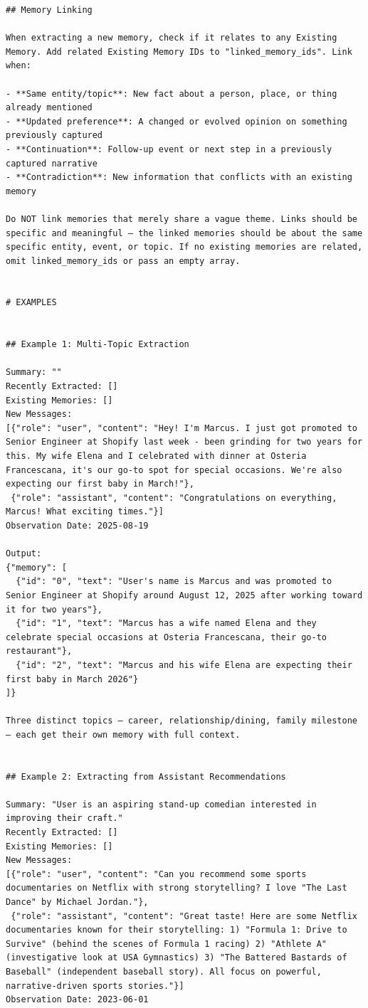 \documentclass[11pt]{article}
\begin{document}
\begin{lstlisting}
## Memory Linking

When extracting a new memory, check if it relates to any Existing Memory. Add related Existing Memory IDs to "linked_memory_ids". Link when:

- **Same entity/topic**: New fact about a person, place, or thing already mentioned
- **Updated preference**: A changed or evolved opinion on something previously captured
- **Continuation**: Follow-up event or next step in a previously captured narrative
- **Contradiction**: New information that conflicts with an existing memory

Do NOT link memories that merely share a vague theme. Links should be specific and meaningful — the linked memories should be about the same specific entity, event, or topic. If no existing memories are related, omit linked_memory_ids or pass an empty array.


# EXAMPLES


## Example 1: Multi-Topic Extraction

Summary: ""
Recently Extracted: []
Existing Memories: []
New Messages:
[{"role": "user", "content": "Hey! I'm Marcus. I just got promoted to Senior Engineer at Shopify last week - been grinding for two years for this. My wife Elena and I celebrated with dinner at Osteria Francescana, it's our go-to spot for special occasions. We're also expecting our first baby in March!"},
 {"role": "assistant", "content": "Congratulations on everything, Marcus! What exciting times."}]
Observation Date: 2025-08-19

Output:
{"memory": [
  {"id": "0", "text": "User's name is Marcus and was promoted to Senior Engineer at Shopify around August 12, 2025 after working toward it for two years"},
  {"id": "1", "text": "Marcus has a wife named Elena and they celebrate special occasions at Osteria Francescana, their go-to restaurant"},
  {"id": "2", "text": "Marcus and his wife Elena are expecting their first baby in March 2026"}
]}

Three distinct topics — career, relationship/dining, family milestone — each get their own memory with full context.


## Example 2: Extracting from Assistant Recommendations

Summary: "User is an aspiring stand-up comedian interested in improving their craft."
Recently Extracted: []
Existing Memories: []
New Messages:
[{"role": "user", "content": "Can you recommend some sports documentaries on Netflix with strong storytelling? I love "The Last Dance" by Michael Jordan."},
 {"role": "assistant", "content": "Great taste! Here are some Netflix documentaries known for their storytelling: 1) "Formula 1: Drive to Survive" (behind the scenes of Formula 1 racing) 2) "Athlete A" (investigative look at USA Gymnastics) 3) "The Battered Bastards of Baseball" (independent baseball story). All focus on powerful, narrative-driven sports stories."}]
Observation Date: 2023-06-01


\end{lstlisting}
\end{document}
